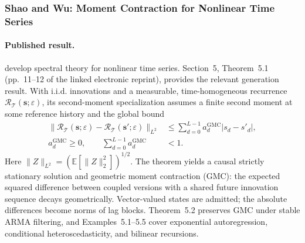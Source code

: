 \subsubsection{Shao and Wu: Moment Contraction for Nonlinear Time Series}
\label{sec:shao-wu-gmc}

\paragraph{Published result.}
\citet{shao2007spectral} develop spectral theory for nonlinear time series.
Section~5, Theorem~5.1 (pp.~11--12 of the linked electronic reprint), provides
the relevant generation result. With i.i.d. innovations and a measurable,
time-homogeneous recurrence $\mathcal R_{\mathcal T}(\mathbf{s};\varepsilon)$,
its second-moment specialization assumes a finite second moment at some
reference history and the global bound
\begin{equation}
\begin{split}
 \|\mathcal R_{\mathcal T}(\mathbf{s};\varepsilon)
       -\mathcal R_{\mathcal T}(\mathbf{s}';\varepsilon)\|_{L^2}
 &\leq \sum_{d=0}^{L-1}a_d^{\mathrm{GMC}}|s_d-s'_d|,\\
 a_d^{\mathrm{GMC}}\geq0,\qquad
 \sum_{d=0}^{L-1}a_d^{\mathrm{GMC}}&<1.
\end{split}
\label{eq:gmc-generator}
\end{equation}
Here $\|Z\|_{L^2}=(\mathbb E[\|Z\|_2^2])^{1/2}$. The theorem yields a
causal strictly stationary solution and geometric moment contraction (GMC):
the expected squared difference between coupled versions with a shared future
innovation sequence decays geometrically. Vector-valued states are admitted;
the absolute differences become norms of lag blocks. Theorem~5.2 preserves
GMC under stable ARMA filtering, and Examples~5.1--5.5 cover exponential
autoregression, conditional heteroscedasticity, and bilinear recursions.

